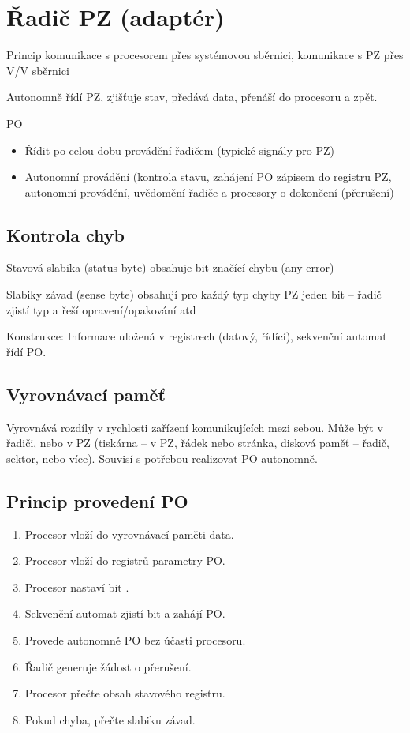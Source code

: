 \documentclass[a4paper, 11pt]{report}
\begin{document}
\section{Řadič PZ (adaptér)}

Princip komunikace s procesorem přes systémovou sběrnici, komunikace s PZ přes V/V sběrnici

Autonomně řídí PZ, zjišťuje stav, předává data, přenáší do procesoru a zpět.

PO
\begin{itemize}
	\item Řídit po celou dobu provádění řadičem (typické signály pro PZ)
	\item Autonomní provádění (kontrola stavu, zahájení PO zápisem do registru PZ, autonomní provádění, uvědomění řadiče a procesory o dokončení (přerušení)
\end{itemize}

\subsection{Kontrola chyb}
\begin{description}	
	\item Stavová slabika (status byte) obsahuje bit značící chybu (any error)
	\item Slabiky závad (sense byte) obsahují pro každý typ chyby PZ jeden bit -- řadič zjistí typ a řeší opravení/opakování atd
\end{description}

Konstrukce: Informace uložená v registrech (datový, řídící), sekvenční automat řídí PO.

\subsection{Vyrovnávací paměť}
Vyrovnává rozdíly v rychlosti zařízení komunikujících mezi sebou. Může být v řadiči, nebo v PZ (tiskárna -- v PZ, řádek nebo stránka, disková paměť -- řadič, sektor, nebo více). Souvisí s potřebou realizovat PO autonomně. 

\subsection{Princip provedení PO}
\begin{enumerate}
	\item Procesor vloží do vyrovnávací paměti data.
	\item Procesor vloží do registrů parametry PO.
	\item Procesor nastaví bit .
	\item Sekvenční automat zjistí bit  a zahájí PO.
	\item Provede autonomně PO bez účasti procesoru.
	\item Řadič generuje žádost o přerušení.
	\item Procesor přečte obsah stavového registru.
	\item Pokud chyba, přečte slabiku závad.
\end{enumerate}
\end{document}

